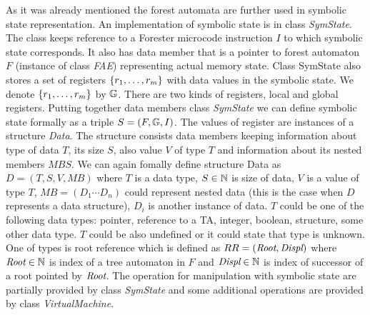 As it was already mentioned the forest automata are further used in symbolic state representation.
An implementation of symbolic state is in class \emph{SymState}.
The class keeps reference to a Forester microcode instruction $I$ to which symbolic state corresponds.
It also has data member that is a pointer to forest automaton $F$ (instance of class \emph{FAE})
representing actual memory state.
Class SymState also stores a set of registers $\{r_1, \ldots, r_m\}$ with data values in the symbolic state.
We denote $\{r_1, \ldots, r_m\}$ by $\mathbb{G}$. 
There are two kinds of registers, local and global registers.
Putting together data members class \emph{SymState}
we can define symbolic state formally as a triple $S=(F, \mathbb{G}, I)$.
The values of register are instances of a structure \emph{Data}.
The structure consists data members keeping information about type of data $T$, its size $S$,
also value $V$ of type $T$ and information about its nested members $MBS$.
We can again fomally define structure Data as $D = (T,S,V,MB)$ where
$T$ is a data type,
$S \in \mathbb{N}$ is size of data,
$V$ is a value of type $T$,
$MB=(D_1 \cdots D_n)$ could represent nested data (this is the case when $D$ represents a data structure),
$D_i$ is another instance of data.
$T$ could be one of the following data types: pointer, reference to a TA, integer, boolean, structure, some other data type.
$T$ could be also undefined or it could state that type is unknown.
One of types is root reference which is defined as $RR=(\emph{Root},\emph{Displ})$
where $\emph{Root} \in \mathbb{N}$ is index of a tree automaton in $F$
and $\emph{Displ} \in \mathbb{N}$ is index of successor of a root pointed by $\emph{Root}$.
The operation for manipulation with symbolic state are partially provided by class \emph{SymState}
and some additional operations are provided by class \emph{VirtualMachine}.


